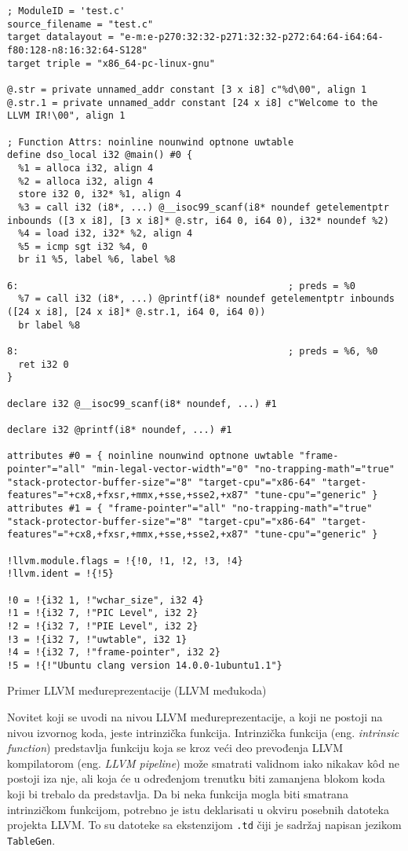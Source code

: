 \documentclass[12pt,oneside]{memoir}
\begin{document}
\begin{listing}
\begin{verbatim}
; ModuleID = 'test.c'
source_filename = "test.c"
target datalayout = "e-m:e-p270:32:32-p271:32:32-p272:64:64-i64:64-f80:128-n8:16:32:64-S128"
target triple = "x86_64-pc-linux-gnu"

@.str = private unnamed_addr constant [3 x i8] c"%d\00", align 1
@.str.1 = private unnamed_addr constant [24 x i8] c"Welcome to the LLVM IR!\00", align 1

; Function Attrs: noinline nounwind optnone uwtable
define dso_local i32 @main() #0 {
  %1 = alloca i32, align 4
  %2 = alloca i32, align 4
  store i32 0, i32* %1, align 4
  %3 = call i32 (i8*, ...) @__isoc99_scanf(i8* noundef getelementptr inbounds ([3 x i8], [3 x i8]* @.str, i64 0, i64 0), i32* noundef %2)
  %4 = load i32, i32* %2, align 4
  %5 = icmp sgt i32 %4, 0
  br i1 %5, label %6, label %8

6:                                                ; preds = %0
  %7 = call i32 (i8*, ...) @printf(i8* noundef getelementptr inbounds ([24 x i8], [24 x i8]* @.str.1, i64 0, i64 0))
  br label %8

8:                                                ; preds = %6, %0
  ret i32 0
}

declare i32 @__isoc99_scanf(i8* noundef, ...) #1

declare i32 @printf(i8* noundef, ...) #1

attributes #0 = { noinline nounwind optnone uwtable "frame-pointer"="all" "min-legal-vector-width"="0" "no-trapping-math"="true" "stack-protector-buffer-size"="8" "target-cpu"="x86-64" "target-features"="+cx8,+fxsr,+mmx,+sse,+sse2,+x87" "tune-cpu"="generic" }
attributes #1 = { "frame-pointer"="all" "no-trapping-math"="true" "stack-protector-buffer-size"="8" "target-cpu"="x86-64" "target-features"="+cx8,+fxsr,+mmx,+sse,+sse2,+x87" "tune-cpu"="generic" }

!llvm.module.flags = !{!0, !1, !2, !3, !4}
!llvm.ident = !{!5}

!0 = !{i32 1, !"wchar_size", i32 4}
!1 = !{i32 7, !"PIC Level", i32 2}
!2 = !{i32 7, !"PIE Level", i32 2}
!3 = !{i32 7, !"uwtable", i32 1}
!4 = !{i32 7, !"frame-pointer", i32 2}
!5 = !{!"Ubuntu clang version 14.0.0-1ubuntu1.1"}
\end{verbatim}
\caption{Primer LLVM međureprezentacije (LLVM međukoda)}
\label{llvm_ir}
\end{listing}

Novitet koji se uvodi na nivou LLVM međureprezentacije, a koji ne postoji na nivou izvornog koda, jeste intrinzička funkcija. Intrinzička funkcija (eng. \textit{intrinsic function}) predstavlja funkciju koja se kroz veći deo prevođenja LLVM kompilatorom (eng. \textit{LLVM pipeline}) može smatrati validnom iako nikakav k\^od ne postoji iza nje, ali koja će u određenjom trenutku biti zamanjena blokom koda koji bi trebalo da predstavlja. Da bi neka funkcija mogla biti smatrana intrinzičkom funkcijom, potrebno je istu deklarisati u okviru posebnih datoteka projekta LLVM. To su datoteke sa ekstenzijom \texttt{.td} čiji je sadržaj napisan jezikom \texttt{TableGen}.
\end{document}
